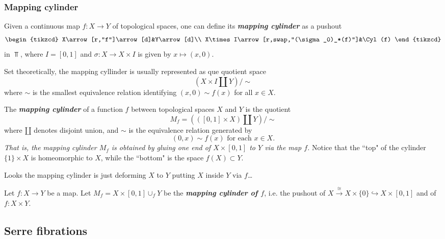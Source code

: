 \begin{remark}
\subsubsection{Mapping cylinder}

\begin{definition}
	Given a continuous map $f:X\to Y$ of topological spaces, one can define its \textbf{\textit{mapping cylinder}} as a pushout
	\[\begin{tikzcd}
		X\arrow[r,"f"]\arrow[d]&Y\arrow[d]\\
		X\times I\arrow[r,swap,"(\sigma_0)_*(f)"]&\Cyl(f)
	\end{tikzcd}\]
	in $\Top$, where $I=[0,1]$ and $\sigma:X\to X\times I$ is given by $x\mapsto(x,0)$.
	
	Set theoretically, the mapping cyllinder is usually represented as que quotient space
	\[\left(X\times I\coprod Y\right)\Big/\sim\]
	where $\sim$ is the smallest equivalence relation identifying $(x,0)\sim f(x)$ for all $x\in X$.
\end{definition}

\begin{definition}
The \textbf{\textit{mapping cylinder}} of a function $f$ between topological spaces $X$ and $Y$ is the quotient
\[M_f=(([0,1]\times X)\amalg Y)\big/\sim\]
where $\amalg$ denotes disjoint union, and $\sim$ is the equivalence relation generated by
\[(0,x)\sim f(x)\text{ for each }x\in X.\]
{\it That is, the mapping cylinder $M_f$ is obtained by gluing one end of $X\times[0,1]$ to $Y$ via the map $f$.} Notice that the ``top" of the cylinder $\{1\}\times X$ is homeomorphic to $X$, while the ``bottom" is the space $f(X)\subset Y$.
	
{\color{persiangreen}Looks the mapping cylinder is just deforming $X$ to $Y$ putting $X$ inside $Y$ via $f$…}
\end{definition}

\begin{definition}
	Let $f:X\to Y$ be a map. Let $M_f=X\times[0,1]\cup_fY$ be the \textbf{\textit{mapping cylinder of $f$}}, i.e. the pushout of $X\overset{\cong}{\to}X\times\{0\}\hookrightarrow X\times[0,1]$ and of $f:X\times Y$.
\end{definition}

\subsection{Serre fibrations}


\end{remark}

